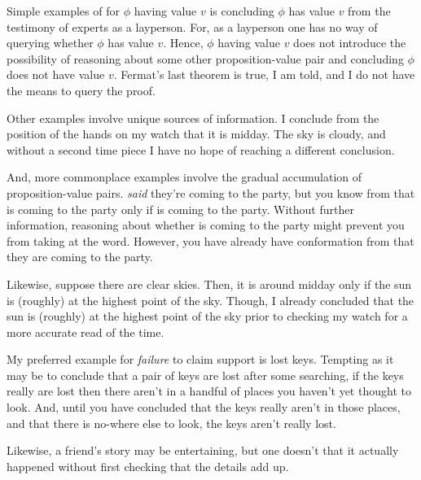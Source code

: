 \begin{note}
  Simple examples of \csV{} for \(\phi\) having value \(v\) is concluding \(\phi\) has value \(v\) from the testimony of experts as a layperson.
  For, as a layperson one has no way of querying whether \(\phi\) has value \(v\).
  Hence, \(\phi\) having value \(v\) does not introduce the possibility of reasoning about some other proposition-value pair and concluding \(\phi\) does not have value \(v\).
  Fermat's last theorem is true, I am told, and I do not have the means to query the proof.

  Other examples involve unique sources of information.
  I conclude from the position of the hands on my watch that it is midday.
  The sky is cloudy, and without a second time piece I have no hope of reaching a different conclusion.

  And, more commonplace examples involve the gradual accumulation of proposition-value pairs.
   \emph{said} they're coming to the party, but you know from  that  is coming to the party only if  is coming to the party.
  Without further information, reasoning about whether  is coming to the party might prevent you from taking  at the word.
  However, you have already have conformation from  that they are coming to the party.

  Likewise, suppose there are clear skies.
  Then, it is around midday only if the sun is (roughly) at the highest point of the sky.
  Though, I already concluded that the sun is (roughly) at the highest point of the sky prior to checking my watch for a more accurate read of the time.
\end{note}

\begin{note}
  My preferred example for \emph{failure} to claim support is lost keys.
  Tempting as it may be to conclude that a pair of keys are lost after some searching, if the keys really are lost then there aren't in a handful of places you haven't yet thought to look.
  And, until you have concluded that the keys really aren't in those places, and that there is no-where else to look, the keys aren't really lost.

  Likewise, a friend's story may be entertaining, but one doesn't \csN{} that it actually happened without first checking that the details add up.
\end{note}

